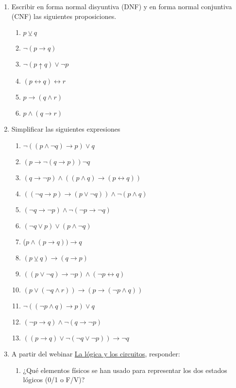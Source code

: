 \documentclass[a4paper]{article}
\newcommand{\Item}{\item[\stepcounter{enumii}$\blacktriangleright$\textbf{(\alph{enumii})}]} %
\newcommand{\exercise}{\item}
\newcommand{\then}{\to}
\newcommand{\eq}{\leftrightarrow}
\newcommand{\xor}{\veebar}
\newcommand{\nand}{\uparrow}
\begin{document}
\begin{enumerate}
\begin{multicols}{2}
\begin{enumerate} [label=(\alph*)]
	\end{enumerate}
	\end{multicols}
	\exercise Escribir en forma normal disyuntiva (DNF) y en forma normal conjuntiva (CNF) las siguientes proposiciones.
	\begin{multicols}{2}
	\begin{enumerate} [label=(\alph*)]
		\item $p\xor q$
		\item $\neg (p\then q)$
		\Item $\neg (p \nand q) \lor \neg p$
		\item $(p \eq  q) \eq r$
		\Item $p\then  (q\land r)$
		\item $p \land (q \then r)$
	\end{enumerate}
	\end{multicols}
	\exercise Simplificar las siguientes expresiones
	\begin{multicols}{2}
	\begin{enumerate} [label=(\alph*)]
		\item $\neg ((p \land \neg q)\then p) \lor q$
		\item $( p \then \neg (q \then p) ) \neg q$
		\item $(q \then \neg p) \land ((p \land q)\then(p \eq q))$
		\item $((\neg q \then p) \then (p \lor \neg q)) \land \neg (p \land q)$
		\item $(\neg q \then \neg p) \land \neg (\neg p \then \neg q)$
		\item $(\neg q \lor p) \lor (p \land \neg q)$
		\item ($p \land ( p \then q)) \then q$
		\item $(p \xor q) \then (q \then p)$
		\item $((p \lor \neg q) \then \neg p) \land (\neg p \eq q)$
		\item $(p \lor (\neg q \land r)) \then (p \then (\neg p \land q))$
		\item $\neg ((\neg p \land q) \then p) \lor q$
		\item $(\neg p \then q) \land \neg (q \then \neg p)$
		\item $((p \then q) \lor \neg (\neg q \lor \neg p)) \then \neg q$
	\end{enumerate}
	\end{multicols}
	\exercise A partir del webinar \href{https://youtu.be/kU3_XLfn4jo}{La lógica y los circuitos}, responder:
	\begin{enumerate} [label=(\alph*)]
		\Item ¿Qué elementos físicos se han usado para representar los dos estados lógicos (0/1 o F/V)? 

\end{enumerate}
\end{enumerate}
\end{document}
